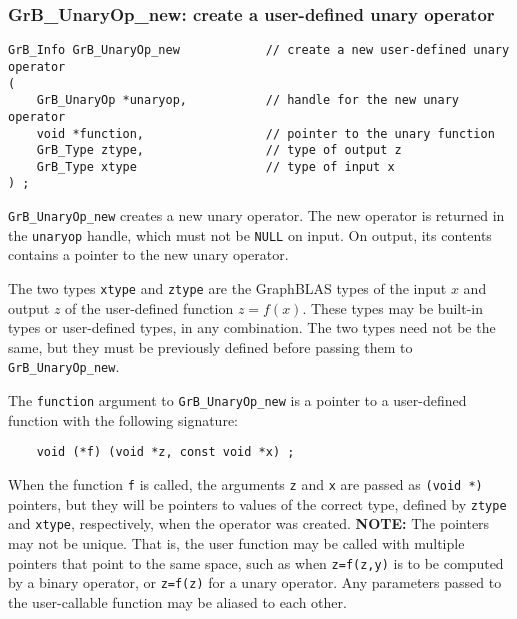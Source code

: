 \documentclass[12pt]{article}
\begin{document}
\subsubsection{{\sf GrB\_UnaryOp\_new:} create a user-defined unary operator}
\label{unaryop_new}

\begin{mdframed}[userdefinedwidth=6in]
{\footnotesize
\begin{verbatim}
GrB_Info GrB_UnaryOp_new            // create a new user-defined unary operator
(
    GrB_UnaryOp *unaryop,           // handle for the new unary operator
    void *function,                 // pointer to the unary function
    GrB_Type ztype,                 // type of output z
    GrB_Type xtype                  // type of input x
) ;
\end{verbatim} }\end{mdframed}

\verb'GrB_UnaryOp_new' creates a new unary operator.  The new operator is
returned in the \verb'unaryop' handle, which must not be \verb'NULL' on input.
On output, its contents contains a pointer to the new unary operator.

The two types \verb'xtype' and \verb'ztype' are the GraphBLAS types of the
input $x$ and output $z$ of the user-defined function $z=f(x)$.  These types
may be built-in types or user-defined types, in any combination.  The two types
need not be the same, but they must be previously defined before passing them
to \verb'GrB_UnaryOp_new'.

The \verb'function' argument to \verb'GrB_UnaryOp_new' is a pointer to a
user-defined function with the following signature:

    {\footnotesize
    \begin{verbatim}
    void (*f) (void *z, const void *x) ; \end{verbatim} }

When the function \verb'f' is called, the arguments \verb'z' and \verb'x' are
passed as \verb'(void *)' pointers, but they will be pointers to values of the
correct type, defined by \verb'ztype' and \verb'xtype', respectively, when the
operator was created.
{\bf NOTE:}
The pointers may not be unique.  That is, the user function may be
called with multiple pointers that point to the same space, such as when
\verb'z=f(z,y)' is to be computed by a binary operator, or \verb'z=f(z)' for a
unary operator.  Any parameters passed to the user-callable function may be
aliased to each other.
\end{document}

